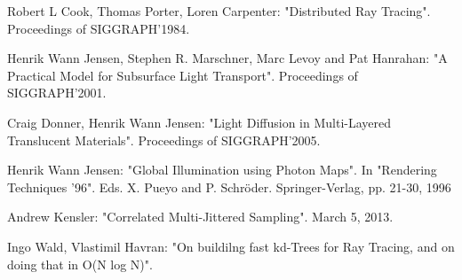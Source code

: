 \documentclass[journal, a4paper]{IEEEtran}
\begin{document}
\begin{thebibliography}{5}

    Robert L Cook, Thomas Porter, Loren Carpenter: "Distributed Ray Tracing". Proceedings of SIGGRAPH'1984.

    Henrik Wann Jensen, Stephen R. Marschner, Marc Levoy and Pat Hanrahan: "A Practical Model for Subsurface Light Transport". Proceedings of SIGGRAPH'2001.

    Craig Donner, Henrik Wann Jensen: "Light Diffusion in Multi-Layered Translucent Materials". Proceedings of SIGGRAPH'2005.

    Henrik Wann Jensen: "Global Illumination using Photon Maps". In "Rendering Techniques '96". Eds. X. Pueyo and P. Schröder. Springer-Verlag, pp. 21-30, 1996

    Andrew Kensler: "Correlated Multi-Jittered Sampling". March 5, 2013.

    Ingo Wald, Vlastimil Havran: "On buildilng fast kd-Trees for Ray Tracing, and on doing that in O(N log N)".

\end{thebibliography}

\end{document}
